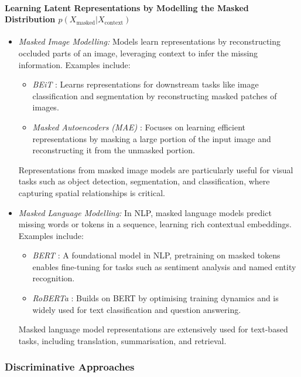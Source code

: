 \paragraph{Learning Latent Representations by Modelling the Masked Distribution $p(X_{\text{masked}}|X_{\text{context}})$}

\begin{itemize}
    \item \textit{Masked Image Modelling:}
    Models learn representations by reconstructing occluded parts of an image, leveraging context to infer the missing information. Examples include:
        \begin{itemize}
            \item \emph{BEiT} \citep{bao2021beit}: Learns representations for downstream tasks like image classification and segmentation by reconstructing masked patches of images.
            \item \emph{Masked Autoencoders (MAE)} \citep{he2022masked}: Focuses on learning efficient representations by masking a large portion of the input image and reconstructing it from the unmasked portion.
        \end{itemize}
        
        Representations from masked image models are particularly useful for visual tasks such as object detection, segmentation, and classification, where capturing spatial relationships is critical.
    

    \item \textit{Masked Language Modelling:}
    In NLP, masked language models predict missing words or tokens in a sequence, learning rich contextual embeddings. Examples include:
        \begin{itemize}
            \item \emph{BERT} \citep{devlin2019bert}: A foundational model in NLP, pretraining on masked tokens enables fine-tuning for tasks such as sentiment analysis and named entity recognition.
            \item \emph{RoBERTa} \citep{liu2019roberta}: Builds on BERT by optimising training dynamics and is widely used for text classification and question answering.
        \end{itemize}
        Masked language model representations are extensively used for text-based tasks, including translation, summarisation, and retrieval.
\end{itemize}

\subsubsection{Discriminative Approaches}

